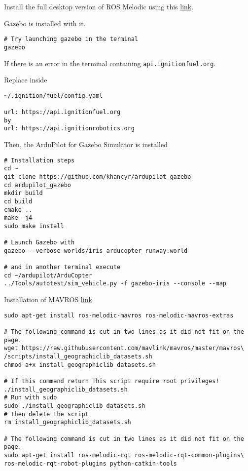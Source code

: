             Install the full desktop version of ROS Melodic using this \href{http://wiki.ros.org/melodic/Installation/Ubuntu}{link}.
            
            Gazebo is installed with it.
            
            \begin{verbatim}
# Try launching gazebo in the terminal
gazebo
            \end{verbatim}
            
            If there is an error in the terminal containing \texttt{api.ignitionfuel.org}.
            
            Replace inside
            \begin{verbatim}
~/.ignition/fuel/config.yaml

url: https://api.ignitionfuel.org
by
url: https://api.ignitionrobotics.org
            \end{verbatim}
            
            Then, the ArduPilot for Gazebo Simulator is installed
            \begin{verbatim}
# Installation steps
cd ~
git clone https://github.com/khancyr/ardupilot_gazebo
cd ardupilot_gazebo
mkdir build
cd build
cmake ..
make -j4
sudo make install

# Launch Gazebo with
gazebo --verbose worlds/iris_arducopter_runway.world

# and in another terminal execute
cd ~/ardupilot/ArduCopter
../Tools/autotest/sim_vehicle.py -f gazebo-iris --console --map
            \end{verbatim}
            
            Installation of MAVROS \href{http://ardupilot.org/dev/docs/ros-install.html#installing-mavros}{link}
            \begin{verbatim}
sudo apt-get install ros-melodic-mavros ros-melodic-mavros-extras

# The following command is cut in two lines as it did not fit on the page.
wget https://raw.githubusercontent.com/mavlink/mavros/master/mavros\
/scripts/install_geographiclib_datasets.sh
chmod a+x install_geographiclib_datasets.sh

# If this command return This script require root privileges!
./install_geographiclib_datasets.sh
# Run with sudo
sudo ./install_geographiclib_datasets.sh
# Then delete the script
rm install_geographiclib_datasets.sh

# The following command is cut in two lines as it did not fit on the page.
sudo apt-get install ros-melodic-rqt ros-melodic-rqt-common-plugins\ ros-melodic-rqt-robot-plugins python-catkin-tools
            \end{verbatim}
            
